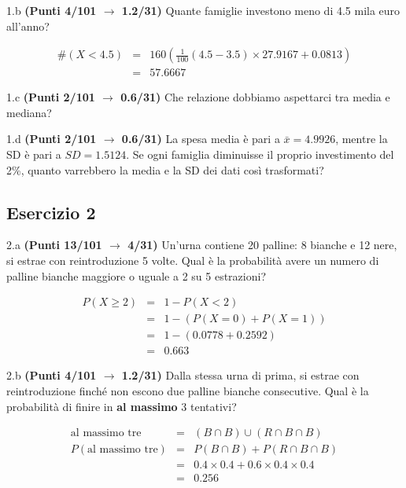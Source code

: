 \documentclass[
  11pt,
]{book}
\theoremstyle{mytheoremstyle}
\theoremstyle{mydefstyle}
\newenvironment{sol}
  {
  \begin{tcolorbox}[enhanced,breakable,arc=0.1mm,boxrule=1pt,colback=white,colframe=iblue,
  title=\bf \fontfamily{lmss}\selectfont \hspace{.5 cm} Soluzione,drop fuzzy shadow]

}{
\end{tcolorbox}
  }
\begin{document}
1.b \textbf{(Punti 4/101 \(\rightarrow\) 1.2/31)} Quante famiglie investono meno di 4.5 mila euro all'anno?

\begin{sol}
\begin{eqnarray*}
  \#(X<4.5) &=&  160(\frac1{100}(4.5-3.5)\times27.9167+0.0813)\\
  &=& 57.6667
\end{eqnarray*}

\end{sol}

1.c \textbf{(Punti 2/101 \(\rightarrow\) 0.6/31)} Che relazione dobbiamo aspettarci tra media e mediana?

1.d \textbf{(Punti 2/101 \(\rightarrow\) 0.6/31)} La spesa media è pari a \(\bar x=4.9926\), mentre la SD è pari a \(SD=1.5124\).
Se ogni famiglia diminuisse il proprio investimento del 2\%, quanto varrebbero la media e la SD dei dati così trasformati?

\subsection{Esercizio 2}\label{esercizio-2-21}

2.a \textbf{(Punti 13/101 \(\rightarrow\) 4/31)} Un'urna contiene 20 palline: 8 bianche e 12 nere, si estrae con reintroduzione 5 volte.
Qual è la probabilità avere un numero di palline bianche maggiore o uguale a 2 su 5 estrazioni?

\begin{sol}
\begin{eqnarray*}
  P(X\ge 2) &=&  1-P(X<2)\\
  &=& 1-(P(X=0)+P(X=1))\\
  &=& 1-(0.0778+0.2592)\\
  &=& 0.663
\end{eqnarray*}

\end{sol}

2.b \textbf{(Punti 4/101 \(\rightarrow\) 1.2/31)} Dalla stessa urna di prima, si estrae con reintroduzione finché non escono due palline bianche consecutive. Qual è la probabilità di finire in \textbf{al massimo} 3 tentativi?

\begin{sol}
\begin{eqnarray*}
  \text{al massimo tre} &=& (B\cap B)\cup(R\cap B\cap B )\\
  P(\text{al massimo tre}) &=& P(B\cap B)+P(R\cap B\cap B)\\
  &=&0.4\times 0.4 +0.6\times 0.4\times 0.4\\
  &=& 0.256
\end{eqnarray*}

\end{sol}
\end{document}

